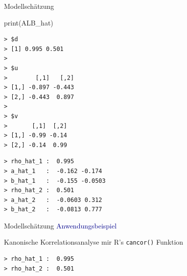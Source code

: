 \documentclass[
  8pt,
  ignorenonframetext,
]{beamer}
\newenvironment{Shaded}{\begin{snugshade}}{\end{snugshade}}
\newcommand{\AttributeTok}[1]{\textcolor[rgb]{0.77,0.63,0.00}{#1}}
\newcommand{\CommentTok}[1]{\textcolor[rgb]{0.56,0.35,0.01}{\textit{#1}}}
\newcommand{\ConstantTok}[1]{\textcolor[rgb]{0.00,0.00,0.00}{#1}}
\newcommand{\FunctionTok}[1]{\textcolor[rgb]{0.00,0.00,0.00}{#1}}
\newcommand{\NormalTok}[1]{#1}
\newcommand{\OtherTok}[1]{\textcolor[rgb]{0.56,0.35,0.01}{#1}}
\newcommand{\SpecialCharTok}[1]{\textcolor[rgb]{0.00,0.00,0.00}{#1}}
\newcommand{\StringTok}[1]{\textcolor[rgb]{0.31,0.60,0.02}{#1}}
\begin{document}
\begin{frame}[fragile]{Modellschätzung}
\begin{Shaded}
\begin{Highlighting}[]
\FunctionTok{print}\NormalTok{(ALB\_hat)}
\end{Highlighting}
\end{Shaded}

\begin{verbatim}
> $d
> [1] 0.995 0.501
> 
> $u
>        [,1]   [,2]
> [1,] -0.897 -0.443
> [2,] -0.443  0.897
> 
> $v
>       [,1]  [,2]
> [1,] -0.99 -0.14
> [2,] -0.14  0.99
\end{verbatim}

\begin{verbatim}
> rho_hat_1 :  0.995 
> a_hat_1   :  -0.162 -0.174 
> b_hat_1   :  -0.155 -0.0503 
> rho_hat_2 :  0.501 
> a_hat_2   :  -0.0603 0.312 
> b_hat_2   :  -0.0813 0.777
\end{verbatim}
\end{frame}

\begin{frame}[fragile]{Modellschätzung}
\protect\hypertarget{modellschuxe4tzung-6}{}
\textcolor{darkblue}{Anwendungsbeispiel} \small

Kanonische Korrelationsanalyse mir R's \texttt{cancor()} Funktion
\vspace{1mm}

\footnotesize
{}

\begin{Shaded}
\end{Shaded}

\begin{verbatim}
> rho_hat_1 :  0.995 
> rho_hat_2 :  0.501
\end{verbatim}
\end{frame}
\end{document}
